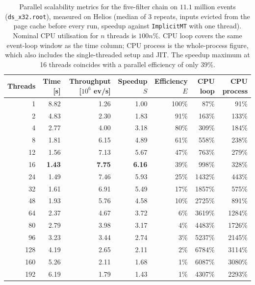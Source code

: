 \begin{table}[htbp]
\centering
\caption{Parallel scalability metrics for the five-filter chain on $11.1$ million events (\texttt{ds\_x32.root}), measured on Helios (median of 3 repeats, inputs evicted from the page cache before every run, speedup against \texttt{ImplicitMT} with one thread). Nominal CPU utilisation for $n$ threads is $100n\%$. CPU loop covers the same event-loop window as the time column; CPU process is the whole-process figure, which also includes the single-threaded setup and JIT. The speedup maximum at 16 threads coincides with a parallel efficiency of only $39\%$.}
\label{tab:scalability-chain}
\begin{tabular}{rrrrrrr}
\toprule
Threads & Time [s] & Throughput [$10^6$ ev/s] & Speedup $S$ & Efficiency $E$ & CPU loop & CPU process \\
\midrule
 1 & 8.82 & 1.26 & 1.00 & 100\% & 87\% & 91\% \\
 2 & 4.83 & 2.30 & 1.83 & 91\% & 163\% & 133\% \\
 4 & 2.77 & 4.00 & 3.18 & 80\% & 309\% & 184\% \\
 8 & 1.81 & 6.15 & 4.89 & 61\% & 558\% & 238\% \\
12 & 1.56 & 7.13 & 5.67 & 47\% & 763\% & 279\% \\
16 & \textbf{1.43} & \textbf{7.75} & \textbf{6.16} & 39\% & 998\% & 328\% \\
24 & 1.49 & 7.46 & 5.93 & 25\% & 1432\% & 443\% \\
32 & 1.61 & 6.91 & 5.49 & 17\% & 1857\% & 575\% \\
48 & 1.93 & 5.76 & 4.58 & 10\% & 2725\% & 891\% \\
64 & 2.37 & 4.67 & 3.72 & 6\% & 3619\% & 1284\% \\
80 & 2.79 & 3.98 & 3.17 & 4\% & 4483\% & 1726\% \\
96 & 3.23 & 3.44 & 2.74 & 3\% & 5237\% & 2145\% \\
128 & 4.19 & 2.65 & 2.11 & 2\% & 6784\% & 3114\% \\
160 & 5.26 & 2.11 & 1.68 & 1\% & 6087\% & 3080\% \\
192 & 6.19 & 1.79 & 1.43 & 1\% & 4307\% & 2293\% \\
\bottomrule
\end{tabular}
\end{table}
